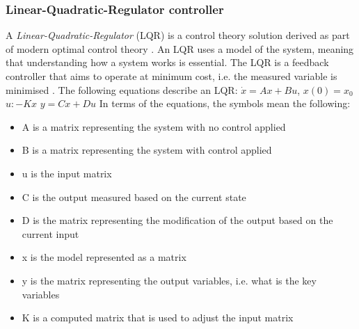 \subsubsection{Linear-Quadratic-Regulator controller}
A \emph{Linear-Quadratic-Regulator} (LQR) is a control theory solution
derived as part of modern optimal control theory \cite{he2000pi}. An
LQR uses a model of the system, meaning that understanding how a system
works is essential. The LQR is a feedback controller that aims to
operate at minimum cost, i.e. the measured variable is minimised \cite{zhang2017cloudgc}.
\newline\newline
The following equations describe an LQR:
\newline\newline
$\dot x = Ax+Bu$, $x(0)=x_0$
\newline\newline
$u: -Kx $
\newline\newline
$y = Cx + Du$
\newline\newline
In terms of the equations, the symbols mean the following:
\begin{itemize}
\item

  A is a matrix representing the system with no control applied

\item

  B is a matrix representing the system with control applied

\item

u is the input matrix

\item

C is the output measured based on the current state

\item

  D is the matrix representing the modification of the output based
  on the current input

\item

  x is the model represented as a matrix

\item

y is the matrix representing the output variables, i.e. what is
  the key variables

\item 
K is a computed matrix that is used to adjust the input matrix

\end{itemize}

